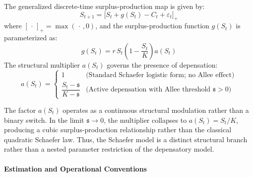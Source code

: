 \documentclass[11pt]{article}
\begin{document}
The generalized discrete-time surplus-production map is given by:
\[S_{t+1} = \Big[ S_t + g(S_t) - C_t + \varepsilon_t \Big]_+\] where
\([\,\cdot\,]_+ = \max(\,\cdot\,, 0)\), and the surplus-production
function \(g(S_t)\) is parameterized as:
\[g(S_t) = r \, S_t \left(1 - \frac{S_t}{K}\right) a(S_t)\] The
structural multiplier \(a(S_t)\) governs the presence of depensation:
\[a(S_t) = \begin{cases} 1 & \text{(Standard Schaefer logistic form; no Allee effect)} \\ \dfrac{S_t - \mathfrak{s}}{K - \mathfrak{s}} & \text{(Active depensation with Allee threshold } \mathfrak{s} > 0\text{)} \end{cases}\]

The factor \(a(S_t)\) operates as a continuous structural modulation
rather than a binary switch. In the limit \(\mathfrak{s} \to 0\), the
multiplier collapses to \(a(S_t) = S_t / K\), producing a cubic
surplus-production relationship rather than the classical quadratic
Schaefer law. Thus, the Schaefer model is a distinct structural branch
rather than a nested parameter restriction of the depensatory model.

\paragraph{Estimation and Operational
Conventions}\label{estimation-and-operational-conventions}
\end{document}
